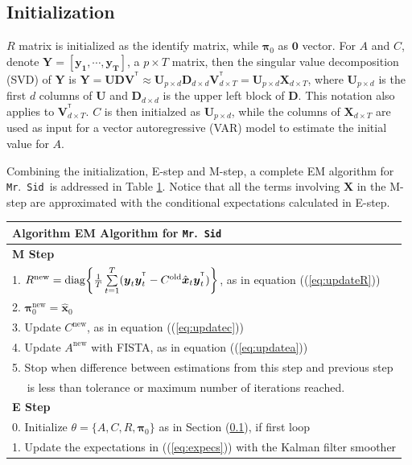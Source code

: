 \documentclass[fleqn,12pt]{article}
\let\oldref\ref
\renewcommand{\ref}[1]{(\oldref{#1})}
\newcommand{\T}{^{\ensuremath{\mathsf{T}}}}           %
\newcommand{\mrsid}{{\sc \texttt{Mr}.~\texttt{Sid}}}
\newcommand{\diag}{\operatornamewithlimits{diag}}
\providecommand{\mb}[1]{\boldsymbol{#1}}
\newcommand{\bx}{\mb{x}}
\newcommand{\by}{\mb{y}}
\newcommand{\bX}{\mb{X}}
\newcommand{\bY}{\mb{Y}}
\begin{document}
\subsection{Initialization}\label{sec:initial}
$R$ matrix is initialized as the identify matrix, while $\mathbf{\pi}_0$ as $\mathbf{0}$ vector. For $A$ and $C$, denote $\bY = \left[\mathbf{y_1},\cdots,\mathbf{y_T}\right]$, a $p\times T$ matrix, then the singular value decomposition (SVD) of $\bY$ is $\bY = \mathbf{UDV^{\T}} \approx \mathbf{U}_{p \times d} \mathbf{D}_{d \times d} \mathbf{V}_{d \times T}^{\T} =\mathbf{U}_{p\times d}\bX_{d \times T}$, where $\mathbf{U}_{p \times d}$ is the first $d$ columns of $\mathbf{U}$ and $\mathbf{D}_{d\times d}$ is the upper left block of $\mathbf{D}$. This notation also applies to $\mathbf{V}^{\T}_{d \times T}$.
$C$ is then initialzed as $\mathbf{U}_{p\times d}$, while the columns of $\bX_{d \times T}$ are used as input for a vector autoregressive (VAR) model to estimate the initial value for $A$.

Combining the initialization, E-step and M-step, a complete EM algorithm for \mrsid~is addressed in Table \oldref{tab:em}. Notice that all the terms involving $\bX$ in the M-step are approximated with the conditional expectations calculated in E-step.\\
\begin{table}
\label{tab:em}
\begin{tabular}{l}
\hline
\textbf{Algorithm } EM Algorithm for \mrsid\\
\hline
\textbf{M Step}\\
1. $R^{\text{new}}=\diag\biggl\{\frac{1}{T}\sum\limits_{t=1}^{T}(\by_t\by_t^{\T}-C^{\text{old}} \hat{\bx}_t\by_t^{\T})\biggr\}$, as in equation \ref{eq:updateR}\\
2. $\mathbf{\pi}_0^{\text{new}}=\hat{\bx}_0$\\
3. Update $C^{\text{new}}$, as in equation \ref{eq:updatec}\\
4. Update $A^{\text{new}}$ with FISTA, as in equation \ref{eq:updatea}\\
5. Stop when difference between estimations from this step and previous step\\
  $\quad$ is less than tolerance or maximum number of iterations reached.\\
\hline
\textbf{E Step}\\
0. Initialize $\theta =\{A,C,R,\mathbf{\pi}_0\}$ as in Section \oldref{sec:initial}, if first loop\\
1. Update the expectations in \ref{eq:expecs} with the Kalman filter smoother\\
\hline
\end{tabular}
\end{table}
\end{document}
